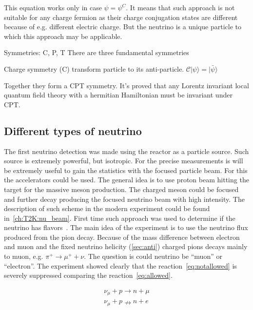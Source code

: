 \documentclass[../main.tex]{subfiles}
\begin{document}
This equation works only in case $\psi=\psi^C$. It means that such approach is not suitable for any charge fermion as their charge conjugation states are different because of e.g. different electric charge. But the neutrino is a unique particle to which this approach may be applicable.

\begin{bclogo}[couleur=blue!2, arrondi=0.1, logo=\bcinfo, nobreak=true]{Symmetries: C, P, T}
There are three fundamental symmetries

Charge symmetry (C) transform particle to its anti-particle. $\mathcal{C}\lvert\psi\rangle=\lvert\bar{\psi}\rangle$

Together they form a CPT symmetry. It's proved that any Lorentz invariant local quantum field theory with a hermitian Hamiltonian must be invariant under CPT.
\end{bclogo}



\subsection{Different types of neutrino}
\label{sec:dublet}
The first neutrino detection was made using the reactor as a particle source. Such source is extremely powerful, but isotropic. For the precise measurements is will be extremely useful to gain the statistics with the focused particle beam. For this the accelerators could be used. The general idea is to use proton beam hitting the target for the massive meson production. The charged meson could be focused and further decay producing the focused neutrino beam with high intensity. The description of such scheme in the modern experiment could be found in~\autoref{ch:T2K:nu_beam}. First time such approach was used to determine if the neutrino has flavors~\cite{Danby1962}. The main idea of the experiment is to use the neutrino flux produced from the pion decay. Because of the mass difference between electron and muon and the fixed neutrino helicity (\autoref{sec:anti}) charged pions decays mainly to muon, e.g. $\pi^+\to\mu^++\nu$. The question is could neutrino be ``muon'' or ``electron''. The experiment showed clearly that the reaction~\autoref{eq:notallowed} is severely suppressed comparing the reaction~\autoref{eq:allowed}.

\begin{eqnarray}
\label{eq:allowed}
\nu_\mu+p\rightarrow n+\mu \\
\nu_\mu+p\nrightarrow n+e
\label{eq:notallowed}
\end{eqnarray}
\end{document}
